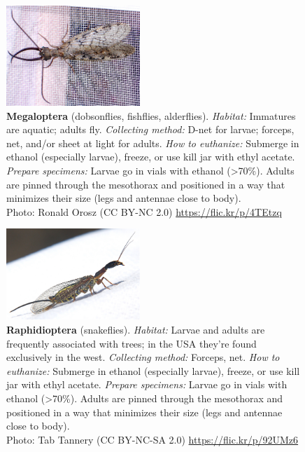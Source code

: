 \documentclass[letterpaper, 11pt]{article}
\begin{document}
\begin{figure}
  \caption*{\textbf{Megaloptera} (dobsonflies, fishflies, alderflies). \textit{Habitat:} Immatures are aquatic; adults fly. \textit{Collecting method:} D-net for larvae; forceps, net, and/or sheet at light for adults. \textit{How to euthanize:} Submerge in ethanol (especially larvae), freeze, or use kill jar with ethyl acetate. \textit{Prepare specimens:} Larvae go in vials with ethanol (\textgreater70\%). Adults are pinned through the mesothorax and positioned in a way that minimizes their size (legs and antennae close to body).\\ Photo: Ronald Orosz (CC BY-NC 2.0) \url{https://flic.kr/p/4TEtzq}}
  \includegraphics[width=0.45\textwidth]{Megaloptera}
\end{figure}

\begin{figure}
  \caption*{\textbf{Raphidioptera} (snakeflies). \textit{Habitat:} Larvae and adults are frequently associated with trees; in the USA they're found exclusively in the west. \textit{Collecting method:} Forceps, net. \textit{How to euthanize:} Submerge in ethanol (especially larvae), freeze, or use kill jar with ethyl acetate. \textit{Prepare specimens:} Larvae go in vials with ethanol (\textgreater70\%). Adults are pinned through the mesothorax and positioned in a way that minimizes their size (legs and antennae close to body).\\ Photo: Tab Tannery (CC BY-NC-SA 2.0) \url{https://flic.kr/p/92UMz6}}
  \includegraphics[width=0.45\textwidth]{Raphidioptera}
\end{figure}
\end{document}
